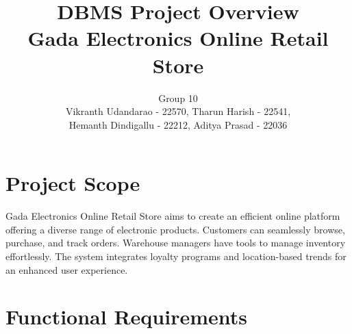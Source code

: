 \documentclass[12pt]{article}
\begin{document}
\title{\textbf{DBMS Project Overview\\ Gada Electronics Online Retail Store}}
\author{Group 10 \\ Vikranth Udandarao - 22570, Tharun Harish - 22541,\\ Hemanth Dindigallu - 22212, Aditya Prasad - 22036}
\date{}
\maketitle

\section*{Project Scope}
Gada Electronics Online Retail Store aims to create an efficient online platform offering a diverse range of electronic products. Customers can seamlessly browse, purchase, and track orders. Warehouse managers have tools to manage inventory effortlessly. The system integrates loyalty programs and location-based trends for an enhanced user experience.

\section*{Functional Requirements}
\end{document}
